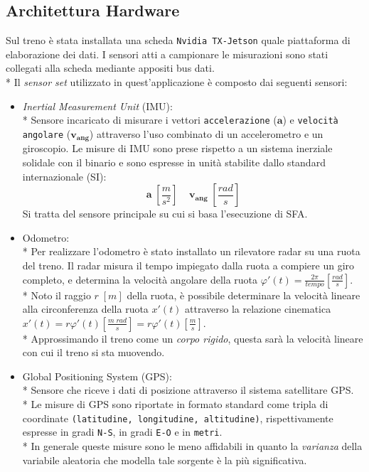 \subsection{Architettura Hardware}
Sul treno \`e stata installata una scheda \texttt{Nvidia TX-Jetson} quale piattaforma di elaborazione dei dati. I sensori atti a campionare le misurazioni sono stati collegati alla scheda mediante appositi bus dati.\\*
Il \emph{sensor set} utilizzato in quest'applicazione \`e composto dai seguenti sensori:
\begin{itemize}
	\item \emph{Inertial Measurement Unit} (IMU):\\*
	Sensore incaricato di misurare i vettori \texttt{accelerazione} ($\mathbf{a}$) e \texttt{velocit\`a angolare} ($\mathbf{v_{ang}}$) attraverso l'uso combinato di un accelerometro e un giroscopio. Le misure di IMU sono prese rispetto a un sistema inerziale solidale con il binario e sono espresse in unit\`a stabilite dallo standard internazionale (SI):
	$$
	\mathbf{a}\;\left[\frac{m}{s^2}\right]\;\;\;\;\mathbf{v_{ang}}\;\left[ \frac{rad}{s} \right]
	$$Si tratta del sensore principale su cui si basa l'esecuzione di SFA.\newpage
	\item Odometro:\\*
	Per realizzare l'odometro \`e stato installato un rilevatore radar su una ruota del treno. Il radar misura il tempo impiegato dalla ruota a compiere un giro completo, e determina la velocit\`a angolare della ruota $\varphi'(t) = \frac{2\pi}{tempo} \left[ \frac{rad}{s}\right]$.\\*
	Noto il raggio $r\;[m]$ della ruota, \`e possibile determinare la velocit\`a lineare alla circonferenza della ruota  $x'(t)$ attraverso la relazione cinematica $x'(t) = r\varphi'(t) \left[ \frac{m\;rad}{s}\right] = r\varphi'(t) \left[ \frac{m}{s} \right]$.\\*
	Approssimando il treno come un \emph{corpo rigido}, questa sar\`a la velocit\`a lineare con cui il treno si sta muovendo.
	\item Global Positioning System (GPS):\\*
	Sensore che riceve i dati di posizione attraverso il sistema satellitare GPS.\\*
	Le misure di GPS sono riportate in formato standard come tripla di coordinate \texttt{(latitudine, longitudine, altitudine)}, rispettivamente espresse in gradi \texttt{N-S}, in gradi \texttt{E-O} e in \texttt{metri}.\\*
	In generale queste misure sono le meno affidabili in quanto la \emph{varianza} della variabile aleatoria che modella tale sorgente \`e la pi\`u significativa.
\end{itemize}
